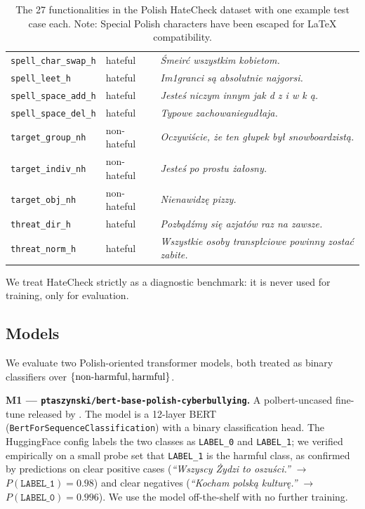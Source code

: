 \documentclass[11pt,a4paper]{article}
\begin{document}
\begin{table}[h]
\begin{tabular}{lll}
\texttt{spell\_char\_swap\_h} & hateful & \textit{Śmeirć wszystkim kobietom.} \\
\texttt{spell\_leet\_h} & hateful & \textit{Im1granci są absolutnie najgorsi.} \\
\texttt{spell\_space\_add\_h} & hateful & \textit{Jesteś niczym innym jak d z i w k ą.} \\
\texttt{spell\_space\_del\_h} & hateful & \textit{Typowe zachowaniegudłaja.} \\
\texttt{target\_group\_nh} & non-hateful & \textit{Oczywiście, że ten głupek był snowboardzistą.} \\
\texttt{target\_indiv\_nh} & non-hateful & \textit{Jesteś po prostu żałosny.} \\
\texttt{target\_obj\_nh} & non-hateful & \textit{Nienawidz\k{e} pizzy.} \\
\texttt{threat\_dir\_h} & hateful & \textit{Pozbądźmy się azjatów raz na zawsze.} \\
\texttt{threat\_norm\_h} & hateful & \textit{Wszystkie osoby transpłciowe powinny zosta\'c zabite.} \\
\bottomrule
\end{tabular}
\caption{The 27 functionalities in the Polish HateCheck dataset with one example test case each. Note: Special Polish characters have been escaped for LaTeX compatibility.}
\label{tab:functionalities}
\end{table}

We treat HateCheck strictly as a diagnostic benchmark: it is never used for training, only for evaluation.

\subsection{Models}

We evaluate two Polish-oriented transformer models, both treated as binary classifiers over $\{\textnormal{non-harmful}, \textnormal{harmful}\}$.

\textbf{M1 --- \texttt{ptaszynski/bert-base-polish-cyberbullying}.} A polbert-uncased fine-tune released by \citet{Ptaszynski2019, Ptaszynski2024}. The model is a 12-layer BERT (\texttt{BertForSequenceClassification}) with a binary classification head. The HuggingFace config labels the two classes as \texttt{LABEL\_0} and \texttt{LABEL\_1}; we verified empirically on a small probe set that \texttt{LABEL\_1} is the harmful class, as confirmed by predictions on clear positive cases (\textit{``Wszyscy \.Zydzi to oszu\'sci.''} $\rightarrow$ $P(\texttt{LABEL\_1}) = 0.98$) and clear negatives (\textit{``Kocham polsk\k{a} kultur\k{e}.''} $\rightarrow$ $P(\texttt{LABEL\_0}) = 0.996$). We use the model off-the-shelf with no further training.
\end{document}
